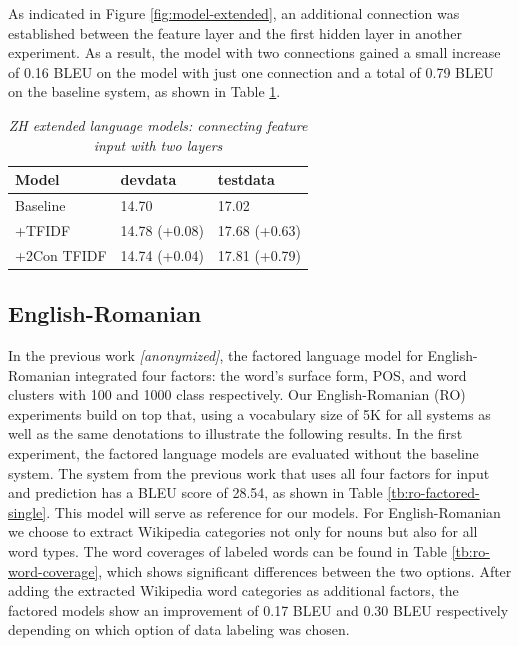 \documentclass[a4paper]{article}
\newcommand{\anony}[1]{\textit{[anonymized]}}
\begin{document}
As indicated in Figure \ref{fig:model-extended}, an additional connection was established between the feature layer and the first hidden layer in another experiment. As a result, the model with two connections gained a small increase of 0.16 BLEU on the model with just one connection and a total of 0.79 BLEU on the baseline system, as shown in Table \ref{tb:zh-extended-both}.


\begin{table}
\caption{\it ZH extended language models: connecting feature input with two layers}
\vspace{2mm}
\centering
  \begin{tabular}{lll}
  	\hline
  	Model       & devdata       & testdata      \\ \hline\hline
  	Baseline    & 14.70         & 17.02         \\ \hline
  	+TFIDF      & 14.78 (+0.08) & 17.68 (+0.63) \\
  	+2Con TFIDF & 14.74 (+0.04) & 17.81 (+0.79)
  \end{tabular}
  \label{tb:zh-extended-both}
\end{table}


\subsection{English-Romanian}
In the previous work \anony{\cite{niehuesusing}}, the factored language model for English-Romanian integrated four factors: the word's surface form, POS, and word clusters with 100 and 1000 class respectively. Our English-Romanian (RO) experiments build on top that, using a vocabulary size of 5K for all systems as well as the same denotations to illustrate the following results. In the first experiment, the factored language models are evaluated without the baseline system. The system from the previous work that uses all four factors for input and prediction has a BLEU score of 28.54, as shown in Table \ref{tb:ro-factored-single}. This model will serve as reference for our models. For English-Romanian we choose to extract Wikipedia categories not only for nouns but also for all word types. The word coverages of labeled words can be found in Table \ref{tb:ro-word-coverage}, which shows significant differences between the two options.
After adding the extracted Wikipedia word categories as additional factors, the factored models show an improvement of 0.17 BLEU and 0.30 BLEU respectively depending on which option of data labeling was chosen.
\end{document}
